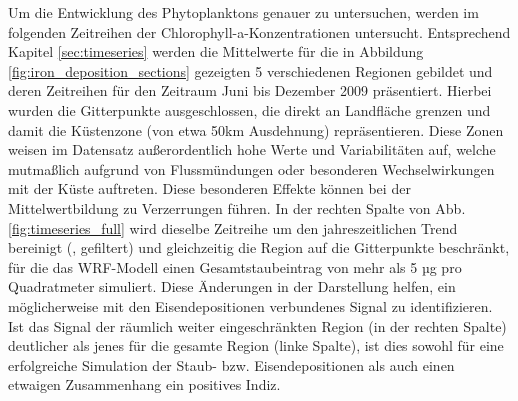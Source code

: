 \documentclass[12pt,a4paper,onecolumn,headheight=30pt]{scrartcl}
\begin{document}
Um die Entwicklung des Phytoplanktons genauer zu untersuchen, werden im folgenden Zeitreihen der Chlorophyll-a-Konzentrationen untersucht. Entsprechend Kapitel \ref{sec:timeseries} werden die Mittelwerte für die in Abbildung \ref{fig:iron_deposition_sections} gezeigten 5 verschiedenen Regionen gebildet und deren Zeitreihen für den Zeitraum Juni bis Dezember 2009 präsentiert. Hierbei wurden die Gitterpunkte ausgeschlossen, die direkt an Landfläche grenzen und damit die Küstenzone (von etwa 50km Ausdehnung) repräsentieren. Diese Zonen weisen im Datensatz außerordentlich hohe Werte und Variabilitäten auf, welche mutmaßlich aufgrund von Flussmündungen oder besonderen Wechselwirkungen mit der Küste auftreten. Diese besonderen Effekte können bei der Mittelwertbildung zu Verzerrungen führen. In der rechten Spalte von Abb. \ref{fig:timeseries_full} wird dieselbe Zeitreihe um den jahreszeitlichen Trend bereinigt (, gefiltert) und gleichzeitig die Region auf die Gitterpunkte beschränkt, für die das WRF-Modell einen Gesamtstaubeintrag von mehr als 5 µg pro Quadratmeter simuliert. Diese Änderungen in der Darstellung helfen, ein möglicherweise mit den Eisendepositionen verbundenes Signal zu identifizieren. Ist das Signal der räumlich weiter eingeschränkten Region (in der rechten Spalte) deutlicher als jenes für die gesamte Region (linke Spalte), ist dies sowohl für eine erfolgreiche Simulation der Staub- bzw. Eisendepositionen als auch einen etwaigen Zusammenhang ein positives Indiz. 
\end{document}
